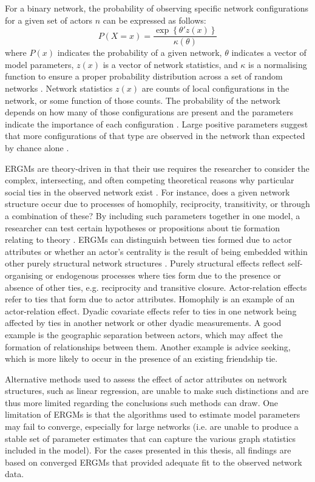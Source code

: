 For a binary network, the probability of observing specific network configurations for a given set of actors \(n\) can be expressed as follows: $$ P(X = x) = \frac{\exp \left \{ \theta'z(x)  \right \}}{\kappa (\theta )} $$ where $P(x)$ indicates the probability of a given network, $\theta$ indicates a vector of model parameters, $z(x)$ is a vector of network statistics, and $\kappa$ is a normalising function to ensure a proper probability distribution across a set of random networks \citep{shumate2010exponential}. Network statistics $z(x)$ are counts of local configurations in the network, or some function of those counts. The probability of the network depends on how many of those configurations are present and the parameters indicate the importance of each configuration \citep{lusher2013exponential}. Large positive parameters suggest that more configurations of that type are observed in the network than expected by chance alone \citep{robins2009closure}. \medskip

ERGMs are theory-driven in that their use requires the researcher to consider the complex, intersecting, and often competing theoretical reasons why particular social ties in the observed network exist \citep{lusher2013exponential}. For instance, does a given network structure occur due to processes of homophily, reciprocity, transitivity, or through a combination of these? By including such parameters together in one model, a researcher can test certain hypotheses or propositions about tie formation relating to theory \citep{robins2007recent}. ERGMs can distinguish between ties formed due to actor attributes or whether an actor’s centrality is the result of being embedded within other purely structural network structures \citep{lusher2013exponential}. Purely structural effects reflect self-organising or endogenous processes where ties form due to the presence or absence of other ties, e.g. reciprocity and transitive closure. Actor-relation effects refer to ties that form due to actor attributes. Homophily is an example of an actor-relation effect. Dyadic covariate effects refer to ties in one network being affected by ties in another network or other dyadic measurements. A good example is the geographic separation between actors, which may affect the formation of relationships between them. Another example is advice seeking, which is more likely to occur in the presence of an existing friendship tie. \medskip

Alternative methods used to assess the effect of actor attributes on network structures, such as linear regression, are unable to make such distinctions and are thus more limited regarding the conclusions such methods can draw. One limitation of ERGMs is that the algorithms used to estimate model parameters may fail to converge, especially for large networks (i.e. are unable to produce a stable set of parameter estimates that can capture the various graph statistics included in the model). For the cases presented in this thesis, all findings are based on converged ERGMs that provided adequate fit to the observed network data.

